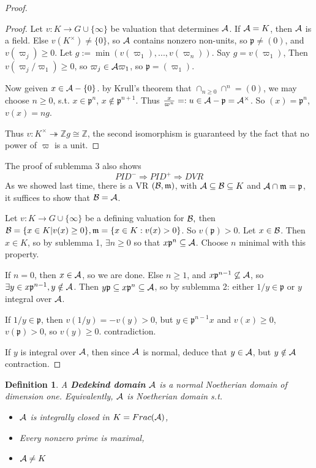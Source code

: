\documentclass[11pt]{article}
\newtheorem{dfn}[thm]{Definition}
\newcommand{\intg}{\mathbb Z}
\newcommand{\scm}{{\mathfrak m}}
\newcommand{\scp}{{\mathfrak p}}
\newcommand{\cala}{{\cal A}}
\newcommand{\calb}{{\cal B}}
\newcommand{\Lrta}{\Longrightarrow}
\newcommand{\lrta}{\longrightarrow}
\newcommand{\surj}{\twoheadrightarrow}
\begin{document}
\begin{proof}
\begin{proof}
Let $v: K\lrta G\cup \{\infty\}$ be valuation that determines $\cala$. If $\cala=K$, then $\cala$ is a field. Else $v(K^\times)\neq \{0\}$, so $\cala$ contains nonzero non-units, so $\scp\neq (0)$, and $v(\varpi_j)\geq 0$. Let $g:=\min(v(\varpi_1),...,v(\varpi_n))$. Say $g=v(\varpi_1)$, Then $v(\varpi_j/\varpi_1)\geq 0$, so $\varpi_j\in \cala \varpi_1$, so $\scp=(\varpi_1)$.

Now geiven $x\in \cala-\{0\}$. by Krull's theorem that $\cap_{n\geq 0}\cap^n=(0)$, we may choose $n\geq 0$, s.t. $x\in \scp^n$, $x\notin \scp^{n+1}$. Thus $\frac{x}{\varpi^n}=:u\in \cala-\scp=\cala^\times$. So $(x)=\scp^n$, $v(x)=ng$.

Thus $v:K^\times \surj \intg g\cong \intg$, the second isomorphism is guaranteed by the fact that no power of $\varpi$ is a unit.
\end{proof}

The proof of sublemma 3 also shows
$$
PID^-\Lrta PID^+\Lrta DVR
$$
As we showed last time, there is a VR $(\calb,\scm)$, with $\cala\subseteq \calb\subseteq K$ and $\cala\cap \scm=\scp$, it suffices to show that $\calb=\cala$.

Let $v:K\lrta G\cup \{\infty\}$ be a defining valuation for $\calb,$ then $\calb=\{x\in K|v(x)\geq 0\},\scm=\{x\in K: v(x)>0\}$. So $v(\scp)>0$. Let $x\in \calb$. Then $x\in K$, so by sublemma 1, $\exists n\geq 0$ so that $x\scp^n\subseteq \cala$. Choose $n$ minimal with this property.

If $n=0$, then $x\in \cala$, so we are done. Else $n\geq 1$, and $x\scp^{n-1}\not\subseteq\cala$, so $\exists y\in x\scp^{n-1},y\notin \cala$. Then $y\scp \subseteq x\scp^n\subseteq \cala$,  so by sublemma 2: either $1/y\in\scp$ or $y$ integral over $\cala$.

If $1/y\in\scp$, then $v(1/y)=-v(y)>0$, but $y\in\scp^{n-1}x$ and $v(x)\geq 0$, $v(\scp)>0$, so $v(y)\geq 0$. contradiction.

If $y$ is integral over $\cala$, then since $\cala$ is normal, deduce that $y\in\cala$, but $y\notin \cala$ contraction.
\end{proof}

\begin{dfn}
A \textbf{Dedekind domain} $\cala$ is a normal Noetherian domain of dimension one. Equivalently, $\cala$ is Noetherian domain s.t.
\begin{itemize}
    \item $\cala$ is integrally closed in $K=Frac(\cala)$,
    \item Every nonzero prime is maximal,
    \item $\cala\neq K$
\end{itemize}
\end{dfn}
\end{document}
